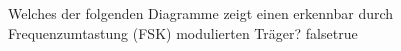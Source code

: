     {Welches der folgenden Diagramme zeigt einen erkennbar durch Frequenzumtastung (FSK) modulierten Träger?}
    {}
    {}
    {}
    {}
    {false}{true}